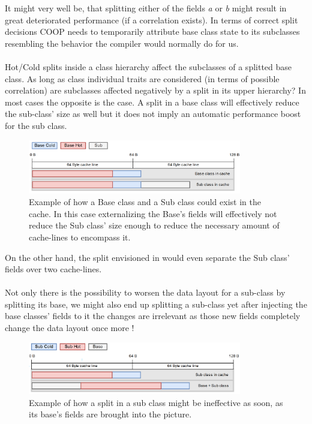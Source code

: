 It might very well be, that splitting either of the fields \textit{a} or \textit{b} might result in great deteriorated performance (if a correlation exists). In terms of correct split decisions COOP needs to temporarily attribute base class state to its subclasses resembling the behavior the compiler would normally do for us.\\\\
Hot/Cold splits inside a class hierarchy affect the subclasses of a splitted base class. As long as class individual traits are considered (in terms of possible correlation) are subclasses affected negatively by a split in its upper hierarchy? In most cases the opposite is the case. A split in a base class will effectively reduce the sub-class' size as well but it does not imply an automatic performance boost for the sub class.
\begin{figure}[!htbp]
	\centering
	\includegraphics[width=0.83\textwidth,height=0.25\textwidth]{PICs/inheritance_split}
	\caption{Example of how a Base class and a Sub class could exist in the cache. In this case externalizing the Base's fields will effectively not reduce the Sub class' size enough to reduce the necessary amount of cache-lines to encompass it.}
	\label{inheritance_split}
\end{figure}
On the other hand, the split envisioned in  would even separate the Sub class' fields over two cache-lines.\\\\
Not only there is the possibility to worsen the data layout for a sub-class by splitting its base, we might also end up splitting a sub-class yet after injecting the base classes' fields to it the changes are irrelevant as those new fields completely change the data layout once more !
\begin{figure}[!htbp]
	\centering
	\includegraphics[width=0.83\textwidth,height=0.25\textwidth]{PICs/inheritance_split_2}
	\caption{Example of how a split in a sub class might be ineffective as soon, as its base's fields are brought into the picture.}
	\label{inheritance_split_2}
\end{figure}
